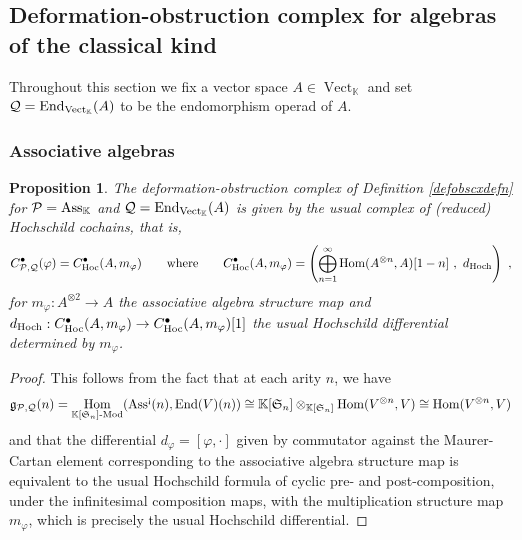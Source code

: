 \documentclass[11pt]{amsart}
\numberwithin{equation}{section}
\newtheorem{prop}[theo]{Proposition}
\theoremstyle{definition}
\newcommand{\bb}{\mathbb}
\newcommand{\mc}{\mathcal}
\newcommand{\mf}{\mathfrak}
\newcommand{\Def}{{\textup{Def}}}
\newcommand{\fDef}{{\mathfrak{Def}}}
\newcommand{\cEnd}{{\textup{End}}}
\newcommand{\fph}{{[\![\hbar]\!]}}
\newcommand{\gd}{{\textup{gr}}}
\DeclareMathOperator{\Hom}{Hom}
\DeclareMathOperator{\Vect}{Vect}
\newcommand{\Mod}{{\textup{-Mod}}}
\newcommand{\K}{{\bb K}}
\newcommand{\ik}{{\bb K}}
\newcommand{\End}{{\textup{End}}}
\newcommand{\Alg}{{\textup{Alg}}}
\newcommand{\ash}{{\textup{\mbox{!`}}}}
\newcommand{\Op}{{\textup{Op}}}
\newcommand{\Ass}{{\textup{Ass}}}
\newcommand{\Ss}{{{\mf{S}}}}
\newcommand{\0}{{\textbf{0}}}
\newcommand{\g}{{\mf{g}}}
\def\PP{{\mc P}}
\def\QQ{{\mc Q}}
\def \mf{\mathfrak}
\def \Op{\mathrm{Op}}
\begin{document}




\subsection{Deformation-obstruction complex for algebras of the classical kind}
Throughout this section we fix a vector space $A\in \Vect_\ik$ and set $\QQ= \cEnd_{\Vect_\ik}(A)$ to be the endomorphism operad of $A$. 

\subsubsection{Associative algebras} 

\begin{prop}\label{Hoccxprop}
The deformation-obstruction complex of Definition \ref{defobscxdefn} for $\mc P=\Ass_\K$ and $\mc Q=\End_{ \Vect_\ik}(A)$ is given by the usual complex of (reduced) Hochschild cochains, that is,
\[ C^\bullet_{\mc P,\mc Q}(\varphi) = C^\bullet_{\textup{Hoc}}(A,m_\varphi) \qquad \text{where}\qquad C^\bullet_{\textup{Hoc}}(A,m_\varphi) = \left( \bigoplus_{n=1}^\infty \Hom(A^{\otimes n}, A)[1-n] \ , \ d_\textup{Hoch} \right)  \ , \]
for $m_\varphi:A^{\otimes 2} \to A$ the associative algebra structure map and $d_\text{Hoch}:C^\bullet_{\textup{Hoc}}(A,m_\varphi)\to C^\bullet_{\textup{Hoc}}(A,m_\varphi)[1]$ the usual Hochschild differential determined by $m_\varphi$.
\end{prop}
\begin{proof}
This follows from the fact that at each arity $n$, we have
\[ \g_{\mc P,\mc Q}(n)= \Hom_{\K[\Ss_n]\Mod}(\Ass^\ash(n), \End(V)(n)) \cong \K[\Ss_n] \otimes_{\K[\Ss_n]} \Hom(V^{\otimes n},V) \cong  \Hom(V^{\otimes n},V) \]
and that the differential $d_\varphi=[\varphi,\cdot]$ given by commutator against the Maurer-Cartan element corresponding to the associative algebra structure map is equivalent to the usual Hochschild formula of cyclic pre- and post-composition, under the infinitesimal composition maps, with the multiplication structure map $m_\varphi$, which is precisely the usual Hochschild differential.
\end{proof}
\end{document}
